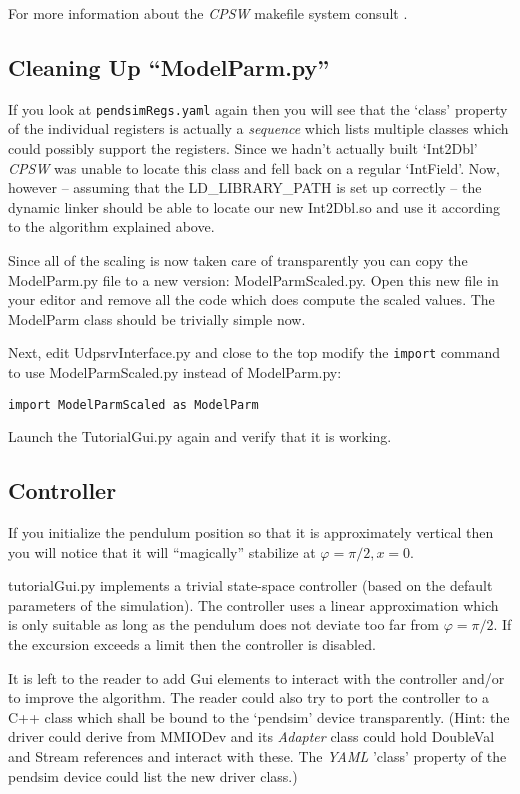 \documentclass[10pt]{article}
\newcommand{\ita}[1]{\emph{#1}}
\newcommand{\cpsw}      {\ita {CPSW}}
\newcommand{\yaml}      {\ita {YAML}}
\newcommand{\cpp}       {C++}
\newcommand{\cod}[1] {{\tt#1}}
\begin{document}
For more information about the \cpsw{} makefile system consult \cite{makefile, INSTALL}.

\subsection{Cleaning Up ``ModelParm.py''}
If you look at \cod{pendsimRegs.yaml} again then you will see that the `class' property
of the individual registers is actually a {\em sequence} which lists multiple classes 
which could possibly support the registers.
Since we hadn't actually built `Int2Dbl' \cpsw{} was unable to locate this class and
fell back on a regular `IntField'. Now, however -- assuming that the LD\_LIBRARY\_PATH
is set up correctly -- the dynamic linker should be able to locate our new Int2Dbl.so
and use it according to the algorithm explained above.

Since all of the scaling is now taken care of transparently you can copy the 
ModelParm.py file to a new version: ModelParmScaled.py. Open this new file in your
editor and remove all the code which does compute the scaled values.
The ModelParm class should be trivially simple now.

Next, edit UdpsrvInterface.py and close to the top modify the \cod{import} 
command to use ModelParmScaled.py instead of ModelParm.py:
\begin{verbatim}
import ModelParmScaled as ModelParm
\end{verbatim}
Launch the TutorialGui.py again and verify that it is working.

\subsection{Controller}
If you initialize the pendulum position so that it is approximately vertical
then you will notice that it will ``magically'' stabilize at $\varphi=\pi/2, x=0$.

tutorialGui.py implements a trivial state-space controller (based on the
default parameters of the simulation). The controller uses a linear approximation
which is only suitable as long as the pendulum does not deviate too far
from $\varphi=\pi/2$. If the excursion exceeds a limit then the controller
is disabled.

It is left to the reader to add Gui elements to interact with the controller
and/or to improve the algorithm. The reader could also try to port the controller
to a \cpp{} class which shall be bound to the `pendsim' device transparently.
(Hint: the driver could derive from MMIODev and its {\em Adapter} class
could hold DoubleVal and Stream references and interact with these. The 
\yaml{} 'class' property of the pendsim device could list the new driver
class.)
\end{document}
